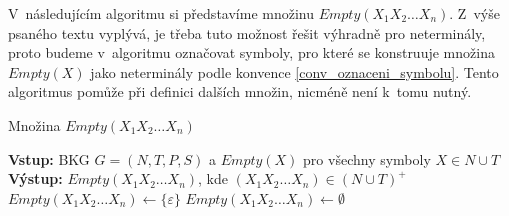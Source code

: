 V~následujícím algoritmu si představíme množinu $Empty(X_1X_2\ldots X_n)$.
Z~výše psaného textu vyplývá, je třeba tuto možnost řešit výhradně pro neterminály, proto budeme v~algoritmu označovat symboly, pro které se konstruuje množina $Empty(X)$ jako neterminály podle konvence \ref{conv_oznaceni_symbolu}.
Tento algoritmus pomůže při definici dalších množin, nicméně není k~tomu nutný. 
\begin{algorithm}[h]
    \caption{Množina $Empty(X_1X_2\ldots X_n)$}
    \label{alg_mnozina_empty_vicn}
    \begin{algorithmic}[1]
        \State \textbf{Vstup:} BKG $G = (N, T, P, S)$ a $Empty(X)$ pro všechny symboly $X \in N \cup T$
        \State \textbf{Výstup:} $Empty(X_1X_2\ldots X_n)$, kde $(X_1X_2\ldots X_n) \in (N \cup T)^+$
        \State
            \State $Empty(X_1X_2\ldots X_n) \gets \{\varepsilon\}$
        \Else
            \State $Empty(X_1X_2\ldots X_n) \gets \emptyset$
        \EndIf
    \end{algorithmic}
\end{algorithm}

